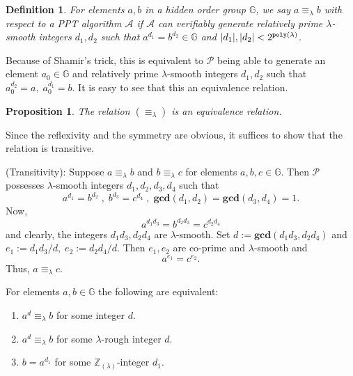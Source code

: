 \documentclass[11pt, lettersize, notitlepage, leqno, footskip=0.6cm]{article}
\newcommand{\bz}{\mathbb Z}
\newcommand{\bG}{\mathbb{G}}
\newcommand{\LRA}{\Longleftrightarrow}
\newcommand{\eqlam}{\equiv_{\lam}}
\newcommand{\wti}{\widetilde}
\newcommand{\mc}{\mathcal}
\newcommand{\mb}{\mathbb}
\newcommand{\mbf}{\mathbf}
\newcommand{\al}{\alpha}
\newcommand{\be}{\beta}
\newcommand{\lam}{\lambda}
\newcommand{\lamb}{\lambda}
\newcommand{\bzlam}{\bz_{(\lam)}}
\newcommand{\A}{\mc{A}}
\newcommand{\vs}{\vspace{-0.15cm}}
\newcommand{\noin}{\noindent}
\newcommand{\GCD}{\mbf{gcd}}
\newtheorem{Prop}[Thm]{Proposition}
\newtheorem{Def}{Definition}[section]
\numberwithin{equation}{section}
\begin{document}
{{{%

\begin{Def} For elements $a, b$ in a hidden order group $\mb{G}$, we say $ a \equiv_{\lam} b$ with respect to a PPT algorithm $\A$ if $\mc{A}$ can verifiably generate relatively prime $\lamb$-smooth integers $d_1, d_2$ such that $a^{d_1} = b^{d_2} \in \bG$ and $|d_1|,|d_2| < 2^{\tt{poly}(\lam)}$. \end{Def}

\noindent Because of Shamir's trick, this is equivalent to $\mc{P}$ being able to generate an element $a_0\in \mb{G}$ and relatively prime $\lamb$-smooth integers $d_1, d_2$ such that $a_0^{d_2} = a, \; a_0^{d_1} = b.$ It is easy to see that this an equivalence relation.

\begin{Prop} The relation $(\equiv_{\lam})$ is an equivalence relation.\end{Prop}

\begin{prf} Since the reflexivity and the symmetry are obvious, it suffices to show that the relation is transitive.

\noindent (Transitivity): Suppose $a \equiv_{\lam} b$ and $b \equiv_{\lam} c$ for elements $a, b, c\in\mb{G}$. Then $\mc{P}$ possesses $\lam$-smooth integers $d_1,d_2, d_3, d_4$ such that \vs $$a^{d_1} = b^{d_2}\;,\; b^{d_3} = c^{d_4}\;,\;\GCD(d_1,d_2) = \GCD(d_3,d_4) = 1.$$ Now, \vs $$a^{d_1d_3} = b^{d_2d_3} = c^{d_2 d_4}$$ and clearly, the integers $d_1d_3, d_2 d_4$ are $\lam$-smooth. Set $d:= \GCD(d_1d_3, d_2 d_4)$ and $e_1:= d_1d_3/d,\; e_2:= d_2 d_4/d$. Then $e_1,e_2$ are co-prime and $\lam$-smooth and \vs $$ a^{e_1} = c^{e_2} .$$ Thus, $a \equiv_{\lam} c$.\end{prf}

For elements $a,b\in\mb{G}$ the following are equivalent:\begin{enumerate}[wide, labelwidth=!, labelindent=0pt] \vs

\item $a^d\eqlam b$ for some integer $d$.\vs
\item $a^d\eqlam b$ for some $\lam$-rough integer $d$.\vs
\item $b = a^{d_1}$ for some $\bzlam$-integer $d_1$.\end{enumerate}

}}}
\end{document}
